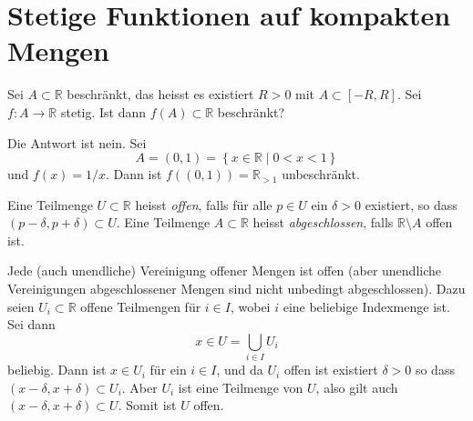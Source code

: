 \documentclass[../main.tex]{subfiles}
\begin{document}
\section{Stetige Funktionen auf kompakten Mengen}

\begin{question}
Sei $A \subset \mathbb{R}$ beschränkt,
das heisst es existiert $R > 0$ 
mit $A \subset [-R, R]$.
Sei $f \colon A \to \mathbb{R}$ stetig.
Ist dann $f(A) \subset \mathbb{R}$ beschränkt?
\end{question}

\begin{example}
  Die Antwort ist nein. Sei 
  \[
    A = (0, 1) = \left\{x \in \mathbb{R} \mid 0 < x < 1\right\}
  \]
  und $f(x) = 1/x$. Dann ist $f((0, 1)) = \mathbb{R}_{>1}$ 
  unbeschränkt.
\end{example}

\begin{definition}
  Eine Teilmenge
  $U \subset \mathbb{R}$ 
  heisst \emph{offen},
  falls für
  alle $p \in U$ ein
  $\delta > 0$ existiert,
  so dass $(p - \delta, p + \delta)
  \subset U$.
Eine Teilmenge
  $A \subset \mathbb{R}$ 
  heisst  \emph{abgeschlossen},
  falls $\mathbb{R} \setminus A$ 
  offen ist.
\end{definition}

\begin{remark}
  Jede (auch unendliche) Vereinigung offener Mengen ist offen
  (aber unendliche Vereinigungen abgeschlossener Mengen
  sind nicht unbedingt abgeschlossen).
  Dazu seien $U_i \subset \mathbb{R}$ offene Teilmengen
  für $i \in I$, wobei $i$ eine 
  beliebige Indexmenge ist. Sei dann
  \[
    x \in U = \bigcup_{i \in I} U_i
  \]
  beliebig. Dann ist $x \in U_i$ für
  ein $i \in I$, und da $U_i$ offen ist existiert
  $\delta > 0$ so dass $(x - \delta, x + \delta) \subset U_i$.
  Aber $U_i$ ist eine Teilmenge von $U$, also
  gilt auch $(x - \delta, x + \delta) \subset U$. Somit ist
  $U$ offen.
\end{remark}
\end{document}
